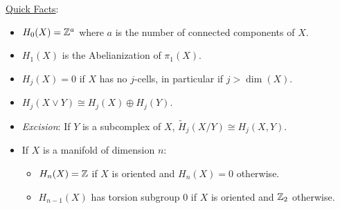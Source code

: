 \documentclass{amsart}
\begin{document}
	\underline{Quick Facts}:
	\begin{itemize}
	\item $H_0(X)=\mathbb{Z}^a$ where $a$ is the number of connected components of $X$. 
	\item $H_1(X)$ is the Abelianization of $\pi_1(X)$.
	\item $H_j(X)=0$ if $X$ has no $j$-cells, in particular if $j>\dim(X)$. 
	\item $H_j(X\vee Y)\cong H_j(X)\oplus H_j(Y)$. 
	\item \textit{Excision}: If $Y$ is a subcomplex of $X$, $\tilde{H}_j(X/Y)\cong H_j(X,Y)$.
	\item If $X$ is a manifold of dimension $n$:
		\begin{itemize}
			\item $H_n(X)=\mathbb{Z}$ if $X$ is oriented and $H_n(X)=0$ otherwise.
			\item $H_{n-1}(X)$ has torsion subgroup $0$ if $X$ is oriented and $\mathbb{Z}_2$ otherwise.
		\end{itemize}
	\end{itemize}
	
\end{document}
